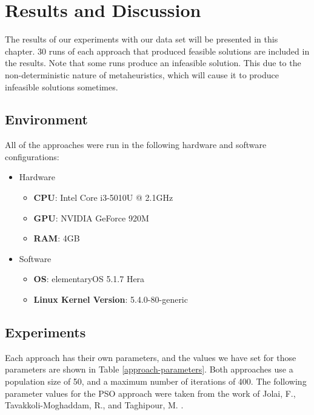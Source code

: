 \chapter{Results and Discussion}
The results of our experiments with our data set will be presented in this chapter. 30 runs of each approach that produced feasible solutions are included in the results. Note that some runs produce an infeasible solution. This due to the non-deterministic nature of metaheuristics, which will cause it to produce infeasible solutions sometimes.

\section{Environment}
All of the approaches were run in the following hardware and software configurations:

\begin{itemize}
	\item Hardware
	\begin{itemize}
		\item \textbf{CPU}: Intel Core i3-5010U @ 2.1GHz
		\item \textbf{GPU}: NVIDIA GeForce 920M
		\item \textbf{RAM}: 4GB
	\end{itemize}
	\item Software
	\begin{itemize}
		\item \textbf{OS}: elementaryOS 5.1.7 Hera
		\item \textbf{Linux Kernel Version}: 5.4.0-80-generic
	\end{itemize}
\end{itemize}

\section{Experiments}
Each approach has their own parameters, and the values we have set for those parameters are shown in Table \ref{approach-parameters}. Both approaches use a population size of 50, and a maximum number of iterations of 400. The following parameter values for the PSO approach were taken from the work of Jolai, F., Tavakkoli-Moghaddam, R., and Taghipour, M. \cite{Jolai2012}.

